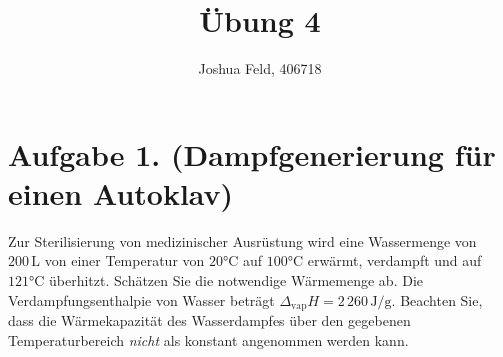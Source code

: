 \documentclass[german,12pt]{homework}
\title{Übung 4}
\author{Joshua Feld, 406718}
\institute{RWTH Aachen University\\Aachener Verfahrenstechnik}
\newcommand{\sis}[1]{\,\si{#1}}
\newcommand{\degC}{\si{\degreeCelsius}}
\begin{document}
    \maketitle

    \section*{Aufgabe 1. (Dampfgenerierung für einen Autoklav)}

    \begin{problem}
        Zur Sterilisierung von medizinischer Ausrüstung wird eine Wassermenge
        von \(200\sis{\liter}\) von einer Temperatur von
        \(20\degC\) auf \(100\degC\) erwärmt,
        verdampft und auf \(121\degC\) überhitzt. Schätzen Sie
        die notwendige Wärmemenge ab. Die Verdampfungsenthalpie von Wasser
        beträgt \(\Delta_\text{vap}H = 2\,260\sis{\joule\per\gram}\). Beachten
        Sie, dass die Wärmekapazität des Wasserdampfes über den gegebenen
        Temperaturbereich \emph{nicht} als konstant angenommen werden kann.
    \end{problem}
\end{document}
